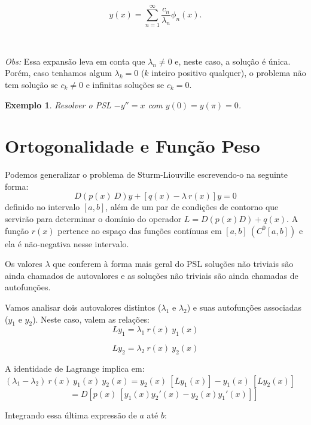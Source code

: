 \documentclass[a4paper,portuguese,9pt,final]{extarticle}
\newtheorem{example}{Exemplo}[section]
\begin{document}
\begin{multicols*}{2}
\begin{itemize}
    $$ y(x)= \sum_{n=1}^{\infty}\frac{c_{n}}{\lambda_{n}}\phi_{n}(x).$$

    \


    \textit{Obs:} Essa expansão leva em conta que $ \lambda_{n}\neq 0 $ e, neste caso, a solução é única. Porém, caso tenhamos algum $ \lambda_{k}=0 $ ($ k $ inteiro positivo qualquer), o problema não tem solução se $ c_{k}\neq 0 $ e infinitas soluções se $ c_{k}=0 $.

    \begin{example}	
        Resolver o PSL $-y''=x$ com $y(0)=y(\pi)=0$.
    \end{example}

\section{Ortogonalidade e Função Peso}

    
    Podemos generalizar o problema de Sturm-Liouville escrevendo-o na seguinte forma:
    $$ D\left(p(x) \ D\right)y + \left[q(x) - \lambda \ r(x)\right]y=0 $$
    definido no intervalo $ [a,b] $, além de um par de condições de contorno que servirão para determinar o domínio do operador $L=D(p(x)D)+q(x)$. A função $r(x)$ pertence ao espaço das funções contínuas em $[a,b] \ (C^{0}[a,b])$ e ela é não-negativa nesse intervalo.

    Os valores $\lambda$ que conferem à forma mais geral do PSL soluções não triviais são ainda chamados de autovalores e as soluções não triviais são ainda chamadas de autofunções.

    Vamos analisar dois autovalores distintos ($ \lambda_{1} $ e $ \lambda_{2} $) e suas autofunções associadas ($ y_{1} $ e $ y_{2} $). Neste caso, valem as relações: \\

    $$Ly_{1}=\lambda_{1} \ r(x) \ y_{1}(x)$$

    $$Ly_{2}=\lambda_{2} \ r(x) \ y_{2}(x)$$ 

    

    A identidade de Lagrange implica em: \\

    $(\lambda_{1}-\lambda_{2}) \ r(x) \ y_{1}(x) \ y_{2}(x) = y_{2}(x) \ [Ly_{1}(x)] - y_{1}(x) \ [Ly_{2}(x)]$\\


    $ \ \ \ \ \ \ \ \ \ \ \ \ \ \ \ \ \ \ \ \ \ \ \  \ \ \ \ \ \ \ \ \ \ \  \ = D[p(x) \ [y_{1}(x)y_{2}'(x) - y_{2}(x)y_{1}'(x)]]$ 


    Integrando essa última expressão de $ a $ até $ b $:


\end{itemize}
\end{multicols*}
\end{document}
